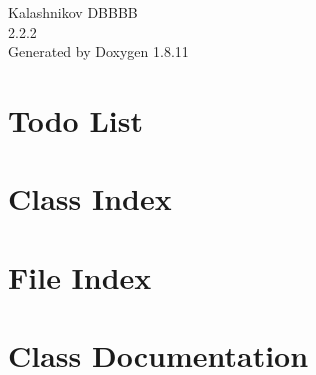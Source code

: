 \documentclass[twoside]{book}
\newcommand{\+}{\discretionary{\mbox{\scriptsize$\hookleftarrow$}}{}{}}
\newcommand{\clearemptydoublepage}{%
  \newpage{\pagestyle{empty}\cleardoublepage}%
}
\begin{document}
\hypersetup{pageanchor=false,
             bookmarksnumbered=true,
             pdfencoding=unicode
            }
\begin{titlepage}
\vspace*{7cm}
\begin{center}%
{\Large Kalashnikov D\+B\+B\+BB \\[1ex]\large 2.\+2.\+2 }\\
\vspace*{1cm}
{\large Generated by Doxygen 1.8.11}\\
\end{center}
\end{titlepage}
\clearemptydoublepage
\tableofcontents
\clearemptydoublepage
{}
\hypersetup{pageanchor=true}

\chapter{Todo List}
\label{todo}
\hypertarget{todo}{}

\chapter{Class Index}

\chapter{File Index}

\chapter{Class Documentation}













































\end{document}
